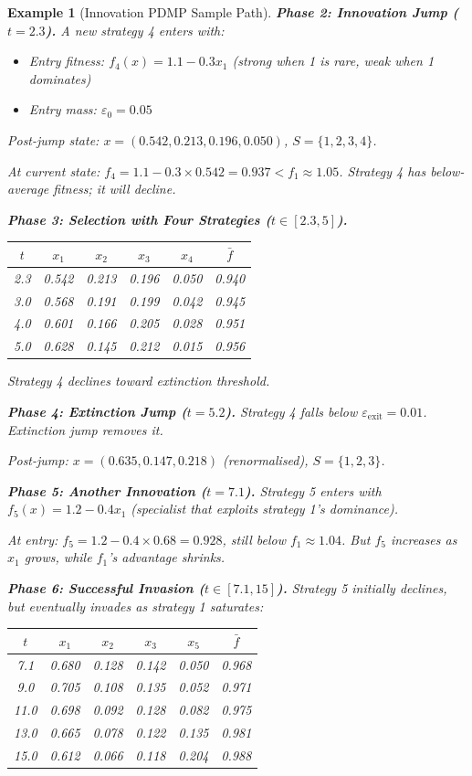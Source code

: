 \documentclass[12pt]{article}
\newtheorem{example}[theorem]{Example}
\begin{document}
\begin{example}[Innovation PDMP Sample Path]
\textbf{Phase 2: Innovation Jump ($t = 2.3$).}
A new strategy 4 enters with:
\begin{itemize}
    \item Entry fitness: $f_4(x) = 1.1 - 0.3x_1$ (strong when 1 is rare, weak when 1 dominates)
    \item Entry mass: $\varepsilon_0 = 0.05$
\end{itemize}

Post-jump state: $x = (0.542, 0.213, 0.196, 0.050)$, $S = \{1, 2, 3, 4\}$.

At current state: $f_4 = 1.1 - 0.3 \times 0.542 = 0.937 < f_1 \approx 1.05$.
Strategy 4 has below-average fitness; it will decline.

\textbf{Phase 3: Selection with Four Strategies ($t \in [2.3, 5]$).}

\begin{center}
\begin{tabular}{c|cccc|c}
$t$ & $x_1$ & $x_2$ & $x_3$ & $x_4$ & $\bar{f}$ \\
\hline
2.3 & 0.542 & 0.213 & 0.196 & 0.050 & 0.940 \\
3.0 & 0.568 & 0.191 & 0.199 & 0.042 & 0.945 \\
4.0 & 0.601 & 0.166 & 0.205 & 0.028 & 0.951 \\
5.0 & 0.628 & 0.145 & 0.212 & 0.015 & 0.956 \\
\end{tabular}
\end{center}

Strategy 4 declines toward extinction threshold.

\textbf{Phase 4: Extinction Jump ($t = 5.2$).}
Strategy 4 falls below $\varepsilon_{\text{exit}} = 0.01$. Extinction jump removes it.

Post-jump: $x = (0.635, 0.147, 0.218)$ (renormalised), $S = \{1, 2, 3\}$.

\textbf{Phase 5: Another Innovation ($t = 7.1$).}
Strategy 5 enters with $f_5(x) = 1.2 - 0.4x_1$ (specialist that exploits strategy 1's dominance).

At entry: $f_5 = 1.2 - 0.4 \times 0.68 = 0.928$, still below $f_1 \approx 1.04$.
But $f_5$ increases as $x_1$ grows, while $f_1$'s advantage shrinks.

\textbf{Phase 6: Successful Invasion ($t \in [7.1, 15]$).}
Strategy 5 initially declines, but eventually invades as strategy 1 saturates:

\begin{center}
\begin{tabular}{c|cccc|c}
$t$ & $x_1$ & $x_2$ & $x_3$ & $x_5$ & $\bar{f}$ \\
\hline
7.1 & 0.680 & 0.128 & 0.142 & 0.050 & 0.968 \\
9.0 & 0.705 & 0.108 & 0.135 & 0.052 & 0.971 \\
11.0 & 0.698 & 0.092 & 0.128 & 0.082 & 0.975 \\
13.0 & 0.665 & 0.078 & 0.122 & 0.135 & 0.981 \\
15.0 & 0.612 & 0.066 & 0.118 & 0.204 & 0.988 \\
\end{tabular}
\end{center}


\end{example}
\end{document}
